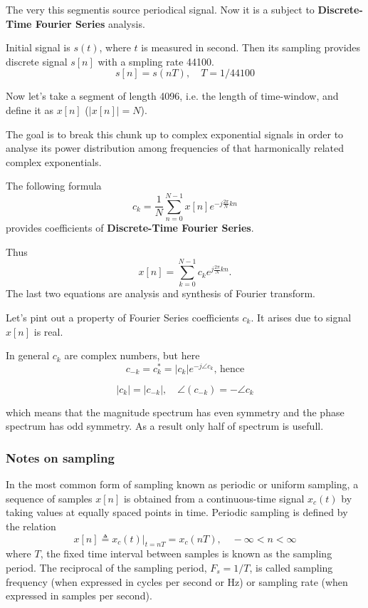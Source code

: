 \documentclass[oneside, final, 14pt]{extarticle}
\begin{document}
The very this segmentis source periodical signal.
Now it is a subject to \textbf{Discrete-Time Fourier Series} analysis.

Initial signal is $s(t)$, where $t$ is measured in second. Then its
sampling provides discrete signal $s[n]$ with a smpling rate 44100.
\[
  s[n] = s(nT), \quad T = 1 / 44100
\]

Now let's take a segment of length 4096, i.e. the length
of time-window, and define it as $x[n]$ ($|x[n]| = N$).

The goal is to break this chunk up to complex exponential signals
in order to analyse its power distribution among frequencies of that
harmonically related complex exponentials.

The following formula
\[
  c_k = \frac{1}{N} \sum_{n=0}^{N-1} x[n] e^{-j\frac{2\pi}{N}kn}
\]
provides coefficients of \textbf{Discrete-Time Fourier Series}.

Thus
\[
  x[n] = \sum_{k=0}^{N-1} c_k e^{j\frac{2\pi}{N}kn}.
\]
The last two equations are analysis and synthesis of Fourier transform.

Let's pint out a property of Fourier Series coefficients $c_k$.
It arises due to signal $x[n]$ is real.

In general $c_k$ are complex numbers, but here
\[
  c_{-k} = c_k^* = |c_k| e^{-j\angle c_k} \text{, hence}
\]

\[
  |c_k| = |c_{-k}|, \quad \angle (c_{-k}) = -\angle c_k
\]

which means that the magnitude spectrum has even symmetry
and the phase spectrum has odd symmetry. As a result
only half of spectrum is usefull.

\subsubsection{Notes on sampling}

In the most common form of sampling known as periodic or uniform sampling,
a sequence of samples $x[n]$ is obtained from a continuous-time signal
$x_c(t)$ by taking values at equally spaced points in time.
Periodic sampling is defined by the relation
\[
  x[n] \triangleq x_c(t) \left. \right|_{t=nT} = x_c(nT), \quad
  - \infty < n < \infty
\]
where $T$, the fixed time interval between samples
is known as the sampling period. The reciprocal of the sampling
period, $F_s = 1 / T$, is called sampling frequency
(when expressed in cycles per second or Hz)
or sampling rate (when expressed in samples per second).
\end{document}
